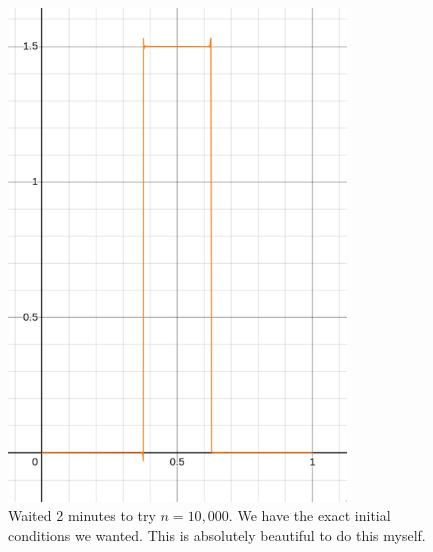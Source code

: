 \documentclass[letter]{article}
\begin{document}
\begin{figure}[H]
	\centering
	\includegraphics[width=0.8\textwidth]{ss/speed07.png}
	\caption{Waited 2 minutes to try $n = 10,000$. We have the exact initial conditions we wanted. This is absolutely beautiful to do this myself. }
	\label{fig:ss-speed07-png}
\end{figure}
\end{document}
